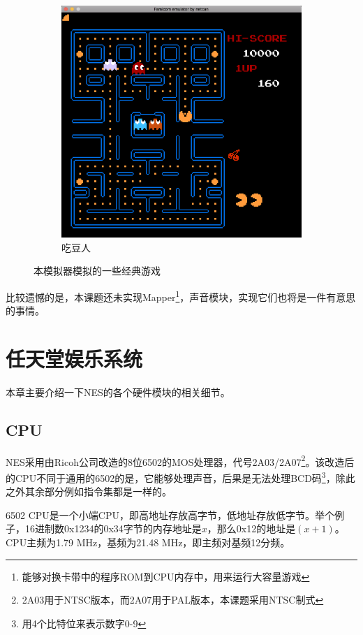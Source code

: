 \documentclass[a4paper]{ltxdoc}
\begin{document}
{\begin{figure}[h]
\begin{subfigure}[b]{0.48\textwidth}
			\includegraphics[width=\textwidth]{images/pac_man.png}
			\caption{吃豆人}
		\end{subfigure}
		\caption{本模拟器模拟的一些经典游戏}
		\label{fig:goal}
\end{figure}

比较遗憾的是，本课题还未实现Mapper\footnote{能够对换卡带中的程序ROM到CPU内存中，用来运行大容量游戏}，声音模块，实现它们也将是一件有意思的事情。

\section{任天堂娱乐系统}
本章主要介绍一下NES的各个硬件模块的相关细节。

\subsection{CPU}
NES采用由Ricoh公司改造的8位6502的MOS处理器，代号2A03/2A07\footnote{2A03用于NTSC版本，而2A07用于PAL版本，本课题采用NTSC制式}。该改造后的CPU不同于通用的6502的是，它能够处理声音，后果是无法处理BCD码\footnote{用4个比特位来表示数字0-9}，除此之外其余部分例如指令集都是一样的。

6502 CPU是一个小端CPU，即高地址存放高字节，低地址存放低字节。举个例子，16进制数0x1234的0x34字节的内存地址是$x$，那么0x12的地址是$(x+1)$。CPU主频为1.79 MHz，基频为21.48 MHz，即主频对基频12分频。

}
\end{document}
